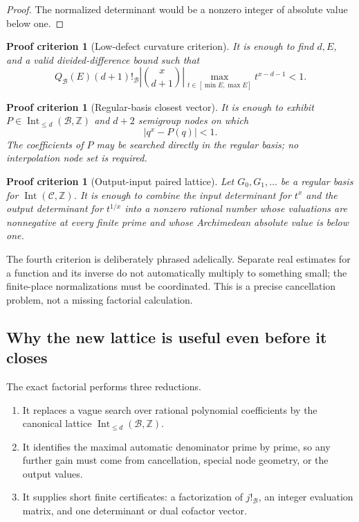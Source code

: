 \documentclass[11pt,oneside]{article}
\newtheorem{criterion}[theorem]{Proof criterion}
\theoremstyle{definition}
\theoremstyle{remark}
\newcommand{\Z}{\mathbb Z}
\newcommand{\B}{\mathcal B}
\newcommand{\Cout}{\mathcal C}
\newcommand{\Int}{\operatorname{Int}}
\begin{document}
\begin{proof}
The normalized determinant would be a nonzero integer of absolute value below one.
\end{proof}

\begin{criterion}[Low-defect curvature criterion]
\label{crit:low-defect}
It is enough to find \(d,E\), and a valid divided-difference bound such that
\begin{equation}
 Q_{\B}(E)(d+1)!_{\B}
 \left|\binom{x}{d+1}\right|
 \max_{t\in[\min E,\max E]}t^{x-d-1}<1.
 \label{eq:low-defect-criterion}
\end{equation}
\end{criterion}

\begin{criterion}[Regular-basis closest vector]
\label{crit:cvp}
It is enough to exhibit \(P\in\Int_{\le d}(\B,\Z)\) and \(d+2\) semigroup nodes on which
\[
 |q^x-P(q)|<1.
\]
The coefficients of \(P\) may be searched directly in the regular basis; no interpolation
node set is required.
\end{criterion}

\begin{criterion}[Output-input paired lattice]
\label{crit:paired}
Let \(G_0,G_1,\ldots\) be a regular basis for
\(\Int(\Cout,\Z)\).  It is enough to combine the input determinant for \(t^x\) and the output
determinant for \(t^{1/x}\) into a nonzero rational number whose valuations are nonnegative at
every finite prime and whose Archimedean absolute value is below one.
\end{criterion}

The fourth criterion is deliberately phrased adelically.  Separate real estimates for a
function and its inverse do not automatically multiply to something small; the finite-place
normalizations must be coordinated.  This is a precise cancellation problem, not a missing
factorial calculation.

\subsection{Why the new lattice is useful even before it closes}

The exact factorial performs three reductions.

\begin{enumerate}
\item It replaces a vague search over rational polynomial coefficients by the canonical
lattice \(\Int_{\le d}(\B,\Z)\).
\item It identifies the maximal automatic denominator prime by prime, so any further gain must
come from cancellation, special node geometry, or the output values.
\item It supplies short finite certificates: a factorization of \(j!_{\B}\), an integer
evaluation matrix, and one determinant or dual cofactor vector.
\end{enumerate}
\end{document}
